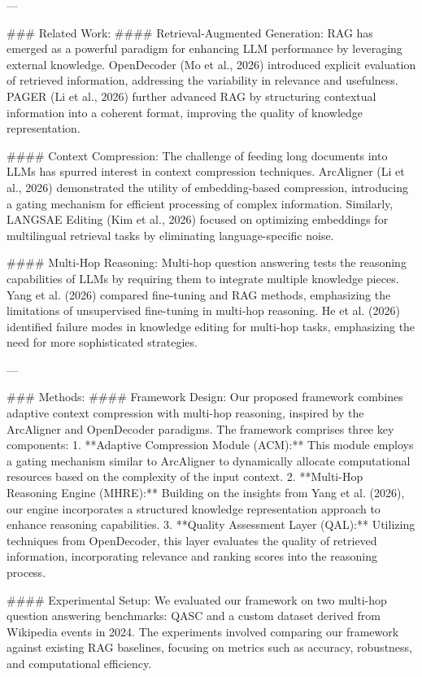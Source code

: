 ---

### Related Work:
#### Retrieval-Augmented Generation:
RAG has emerged as a powerful paradigm for enhancing LLM performance by leveraging external knowledge. OpenDecoder (Mo et al., 2026) introduced explicit evaluation of retrieved information, addressing the variability in relevance and usefulness. PAGER (Li et al., 2026) further advanced RAG by structuring contextual information into a coherent format, improving the quality of knowledge representation.

#### Context Compression:
The challenge of feeding long documents into LLMs has spurred interest in context compression techniques. ArcAligner (Li et al., 2026) demonstrated the utility of embedding-based compression, introducing a gating mechanism for efficient processing of complex information. Similarly, LANGSAE Editing (Kim et al., 2026) focused on optimizing embeddings for multilingual retrieval tasks by eliminating language-specific noise.

#### Multi-Hop Reasoning:
Multi-hop question answering tests the reasoning capabilities of LLMs by requiring them to integrate multiple knowledge pieces. Yang et al. (2026) compared fine-tuning and RAG methods, emphasizing the limitations of unsupervised fine-tuning in multi-hop reasoning. He et al. (2026) identified failure modes in knowledge editing for multi-hop tasks, emphasizing the need for more sophisticated strategies.

---

### Methods:
#### Framework Design:
Our proposed framework combines adaptive context compression with multi-hop reasoning, inspired by the ArcAligner and OpenDecoder paradigms. The framework comprises three key components:
1. **Adaptive Compression Module (ACM):** This module employs a gating mechanism similar to ArcAligner to dynamically allocate computational resources based on the complexity of the input context.
2. **Multi-Hop Reasoning Engine (MHRE):** Building on the insights from Yang et al. (2026), our engine incorporates a structured knowledge representation approach to enhance reasoning capabilities.
3. **Quality Assessment Layer (QAL):** Utilizing techniques from OpenDecoder, this layer evaluates the quality of retrieved information, incorporating relevance and ranking scores into the reasoning process.

#### Experimental Setup:
We evaluated our framework on two multi-hop question answering benchmarks: QASC and a custom dataset derived from Wikipedia events in 2024. The experiments involved comparing our framework against existing RAG baselines, focusing on metrics such as accuracy, robustness, and computational efficiency.

